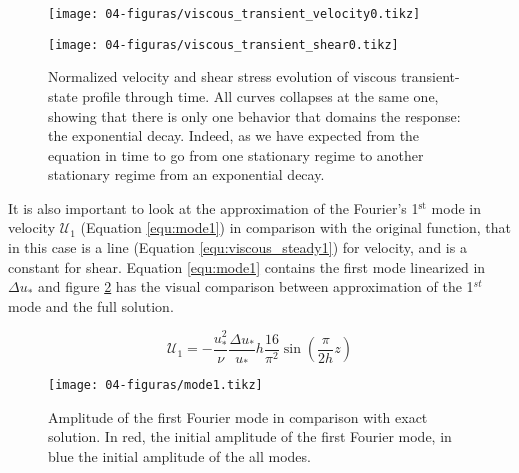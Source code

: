 \begin{figure}[H]
    \centering
    \parbox{1\textwidth}{
        \centering
        \texttt{[image: 04-figuras/viscous\_transient\_velocity0.tikz]}
        \label{fig:viscous_transient_velocity0}
    }
    \parbox{1\textwidth}{
        \centering
        \texttt{[image: 04-figuras/viscous\_transient\_shear0.tikz]}
        \label{fig:viscous_transient_shear0}
    }
    \caption[Normalized profiles for viscous fluid.]{Normalized velocity and shear stress evolution of viscous transient-state profile through time. All curves collapses at the same one, showing that there is only one behavior that domains the response: the exponential decay. Indeed, as we have expected from the equation in time to go from one stationary regime to another stationary regime from an exponential decay.}
    \label{fig:viscous_transient0}
\end{figure}

    It is also important to look at the approximation of the Fourier's 1$^\textrm{st}$ mode in velocity $\mathcal{U}_1$ (Equation \ref{equ:mode1}) in comparison with the original function, that in this case is a line (Equation \ref{equ:viscous_steady1}) for velocity, and is a constant for shear. Equation \ref{equ:mode1} contains the first mode linearized in $\Delta u_*$ and figure \ref{fig:mode1} has the visual comparison between approximation of the 1$^{st}$ mode and the full solution.

\begin{equation}
    \mathcal{U}_1 = -\frac{u_*^2}{\nu}\frac{\Delta u_*}{u_*}h\frac{16}{\pi^2}\sin\left(\frac{\pi}{2h}z\right)
    \label{equ:mode1}
\end{equation}

\begin{figure}[H]
    \centering
    \texttt{[image: 04-figuras/mode1.tikz]}
    \caption[Comparison between 1$^{st}$ Fourier mode and exact solution for viscous fluid velocity.]{Amplitude of the first Fourier mode in comparison with exact solution. In red, the initial amplitude of the first Fourier mode, in blue the initial amplitude of the all modes.}
    \label{fig:mode1}
\end{figure}

